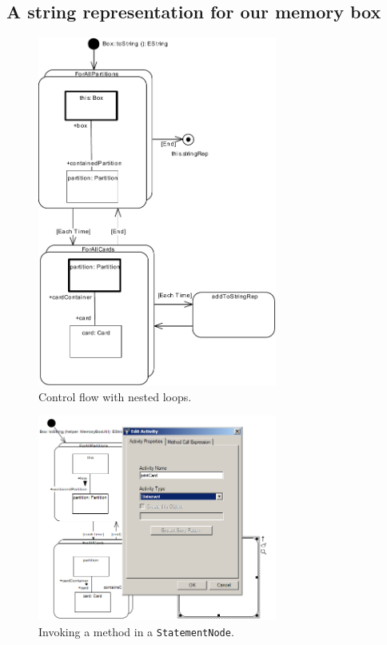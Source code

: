 \subsection{A string representation for our memory box}
\begin{figure}[htbp]
\begin{center}
  \includegraphics[width=0.7\textwidth]{pics/sdmBilder/toString/sdm72}
  \caption{Control flow with nested loops.}  
  \label{fig:sdm_invert_1}
\end{center}
\end{figure}

\begin{figure}[htbp]
\begin{center}
  \includegraphics[width=0.7\textwidth]{pics/sdmBilder/toString/sdm73}
  \caption{Invoking a method in a \texttt{StatementNode}.}  
  \label{fig:sdm_invert_2}
\end{center}
\end{figure}


